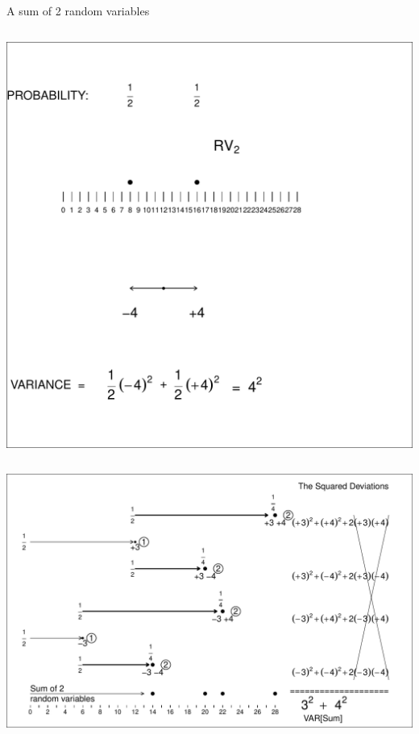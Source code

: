 \documentclass[10pt]{beamer}\usepackage[]{graphicx}\usepackage[]{color}
\makeatletter
\def\maxwidth{ %
  \ifdim\Gin@nat@width>\linewidth
    \linewidth
  \else
    \Gin@nat@width
  \fi
}
\newenvironment{knitrout}{}{} %
\makeatother
\begin{document}
\begin{frame}[fragile]{A sum of 2 random variables}
\begin{columns}
\begin{column}{0.5\textwidth}
\begin{knitrout}
{\centering \includegraphics[width=1\linewidth]{figure/unnamed-chunk-9-1} 

}


\end{knitrout}
	\end{column}
	\end{columns}
	
\end{frame}

\begin{frame}
\begin{knitrout}\tiny
{}\color{fgcolor}

{\centering \includegraphics[width=\maxwidth]{figure/unnamed-chunk-10-1} 

}


\end{knitrout}

\end{frame}
\end{document}
